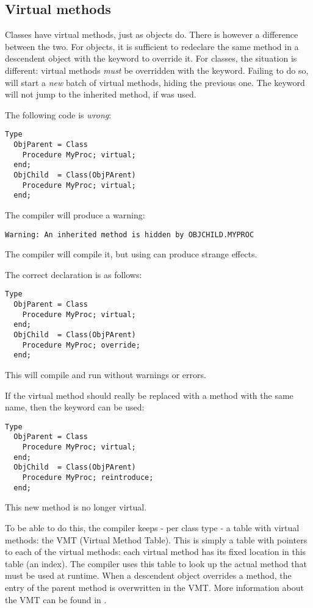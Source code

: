 \subsection{Virtual methods}
Classes have virtual methods, just as objects do. There is however a
difference between the two. For objects, it is sufficient to redeclare the
same method in a descendent object with the keyword  to
override it. For classes, the situation is different: virtual methods 
{\em must} be overridden with the  keyword. Failing to do so,
will start a {\em new} batch of virtual methods, hiding the previous
one.  The  keyword will not jump to the inherited method, if
 was used.

The following code is {\em wrong}:
\begin{verbatim}
Type 
  ObjParent = Class
    Procedure MyProc; virtual;
  end;
  ObjChild  = Class(ObjPArent)
    Procedure MyProc; virtual;
  end;
\end{verbatim}
The compiler will produce a warning:
\begin{verbatim}
Warning: An inherited method is hidden by OBJCHILD.MYPROC
\end{verbatim}
The compiler will compile it, but using  can
produce strange effects.

The correct declaration is as follows:
\begin{verbatim}
Type 
  ObjParent = Class
    Procedure MyProc; virtual;
  end;
  ObjChild  = Class(ObjPArent)
    Procedure MyProc; override;
  end;
\end{verbatim}
This will compile and run without warnings or errors.

If the virtual method should really be replaced with a method with the 
same name, then the  keyword can be used: 
\begin{verbatim}
Type 
  ObjParent = Class
    Procedure MyProc; virtual;
  end;
  ObjChild  = Class(ObjPArent)
    Procedure MyProc; reintroduce;
  end;
\end{verbatim}
This new method is no longer virtual.

To be able to do this, the compiler keeps - per class type - a table with
virtual methods: the VMT (Virtual Method Table). This is simply a table 
with pointers to each of the virtual methods: each virtual method has its
fixed location in this table (an index). The compiler uses this table to 
look up the actual method that must be used at runtime. When a descendent object
overrides a method, the entry of the parent method is overwritten in the
VMT. More information about the VMT can be found in \progref.

